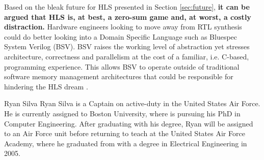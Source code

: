 \documentclass[12pt,journal,compsoc,onecolumn]{IEEEtran}
\begin{document}
Based on the bleak future for HLS presented in Section \ref{sec:future}, \textbf{it can be argued that HLS is, at best, a zero-sum game and, at worst, a costly distraction.} Hardware engineers looking to move away from RTL synthesis could do better looking into a Domain Specific Language such as Bluespec System Verilog (BSV). BSV raises the working level of abstraction yet stresses architecture, correctness and parallelism at the cost of a familiar, i.e. C-based, programming experience\cite{bsv}. This allows BSV to operate outside of traditional software memory management architectures that could be responsible for hindering the HLS dream \cite{bluespec}.




\begin{IEEEbiography}{Ryan Silva}
	Ryan Silva is a Captain on active-duty in the United States Air Force. He is currently assigned to Boston University, where is pursuing his PhD in Computer Engineering. After graduating with his degree, Ryan will be assigned to an Air Force unit before returning to teach at the United States Air Force Academy, where he graduated from with a degree in Electrical Engineering in 2005.
\end{IEEEbiography}
\end{document}
